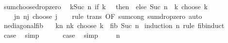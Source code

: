 \begin{isabellebody}
\ sum{\isacharunderscore}{\kern0pt}choose{\isacharunderscore}{\kern0pt}drop{\isacharunderscore}{\kern0pt}zero{\isacharcolon}{\kern0pt}\isanewline
\ \ {\isachardoublequoteopen}{\isacharparenleft}{\kern0pt}{\isasymSum}k{\isasymle}Suc\ n{\isachardot}{\kern0pt}\ if\ k\ {\isacharequal}{\kern0pt}\ {}\ then\ {}\ else\ {\isacharparenleft}{\kern0pt}Suc\ n\ {\isacharminus}{\kern0pt}\ k{\isacharparenright}{\kern0pt}\ choose\ {\isacharparenleft}{\kern0pt}k\ {\isacharminus}{\kern0pt}\ {}{\isacharparenright}{\kern0pt}{\isacharparenright}{\kern0pt}\ {\isacharequal}{\kern0pt}\isanewline
\ \ \ \ {\isacharparenleft}{\kern0pt}{\isasymSum}j{\isasymle}n{\isachardot}{\kern0pt}\ {\isacharparenleft}{\kern0pt}n{\isacharminus}{\kern0pt}j{\isacharparenright}{\kern0pt}\ choose\ j{\isacharparenright}{\kern0pt}{\isachardoublequoteclose}\isanewline
%
\isadelimproof
\ \ %
\endisadelimproof
%
\isatagproof
{}\isamarkupfalse%
\ {\isacharparenleft}{\kern0pt}rule\ trans\ {\isacharbrackleft}{\kern0pt}OF\ sum{\isachardot}{\kern0pt}cong\ sum{\isacharunderscore}{\kern0pt}drop{\isacharunderscore}{\kern0pt}zero{\isacharbrackright}{\kern0pt}{\isacharparenright}{\kern0pt}\ auto%
\endisatagproof
{\isafoldproof}%
%
\isadelimproof
\isanewline
%
\endisadelimproof
\isanewline
{}\isamarkupfalse%
\ ne{\isacharunderscore}{\kern0pt}diagonal{\isacharunderscore}{\kern0pt}fib{\isacharcolon}{\kern0pt}\isanewline
\ \ \ {\isachardoublequoteopen}{\isacharparenleft}{\kern0pt}{\isasymSum}k{\isasymle}n{\isachardot}{\kern0pt}\ {\isacharparenleft}{\kern0pt}n{\isacharminus}{\kern0pt}k{\isacharparenright}{\kern0pt}\ choose\ k{\isacharparenright}{\kern0pt}\ {\isacharequal}{\kern0pt}\ fib\ {\isacharparenleft}{\kern0pt}Suc\ n{\isacharparenright}{\kern0pt}{\isachardoublequoteclose}\isanewline
%
\isadelimproof
%
\endisadelimproof
%
\isatagproof
{}\isamarkupfalse%
\ {\isacharparenleft}{\kern0pt}induction\ n\ rule{\isacharcolon}{\kern0pt}\ fib{\isachardot}{\kern0pt}induct{\isacharparenright}{\kern0pt}\isanewline
\ \ \isamarkupfalse%
\ {}\ \isamarkupfalse%
\ {\isacharquery}{\kern0pt}case\ \isamarkupfalse%
\ simp\isanewline
{}\isamarkupfalse%
\isanewline
\ \ \isamarkupfalse%
\ {}\ \isamarkupfalse%
\ {\isacharquery}{\kern0pt}case\ \isamarkupfalse%
\ simp\isanewline
{}\isamarkupfalse%
\isanewline
\ \ \isamarkupfalse%
\ {\isacharparenleft}{\kern0pt}{}\ n{\isacharparenright}{\kern0pt}\isanewline

\end{isabellebody}
